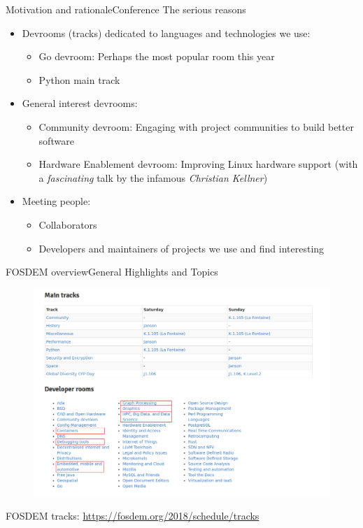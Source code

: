 \documentclass[10pt]{beamer}
\begin{document}
\begin{frame}{Motivation and rationale}{Conference}
    The serious reasons
    \begin{itemize}
        \item Devrooms (tracks) dedicated to languages and technologies we use:
            \begin{itemize}
                \item Go devroom: Perhaps the most popular room this year
                \item Python main track
            \end{itemize}
        \item General interest devrooms:
            \begin{itemize}
                \item Community devroom: Engaging with project communities to build better software
                \item Hardware Enablement devroom: Improving Linux hardware support (with a \emph{fascinating} talk by the infamous \emph{Christian Kellner})
            \end{itemize}
        \item Meeting people:
            \begin{itemize}
                \item Collaborators
                \item Developers and maintainers of projects we use and find interesting
            \end{itemize}
    \end{itemize}
\end{frame}

\begin{frame}{FOSDEM overview}{General Highlights and Topics}
    \begin{figure}
        \includegraphics[width=\textwidth]{tracks-devrooms.png}
    \end{figure}

    FOSDEM tracks: \url{https://fosdem.org/2018/schedule/tracks}
\end{frame}
\end{document}

